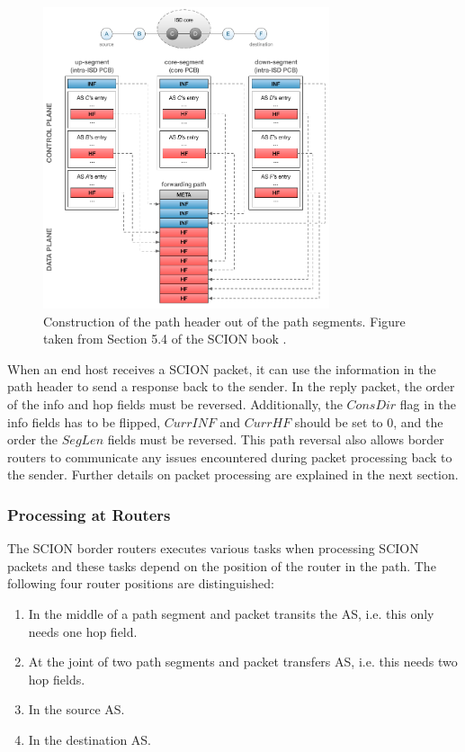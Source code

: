\begin{figure}[h]
    \centering
    \includegraphics[width=0.75\textwidth]{figures/scion_path_header_construction.png}
    \caption{Construction of the path header out of the path segments. Figure taken from Section 5.4 of the SCION book \cite{Perrig2022}.}
    \label{fig:scion_path_header_contruction}
\end{figure}

When an end host receives a SCION packet, it can use the information in the path header to send a response back to the sender.
In the reply packet, the order of the info and hop fields must be reversed.
Additionally, the $ConsDir$ flag in the info fields has to be flipped, $CurrINF$ and $CurrHF$ should be set to 0, and the order the $SegLen$ fields must be reversed.
This path reversal also allows border routers to communicate any issues encountered during packet processing back to the sender.
Further details on packet processing are explained in the next section.

\subsubsection{Processing at Routers}

The SCION border routers executes various tasks when processing SCION packets and these tasks depend on the position of the router in the path.
The following four router positions are distinguished:

\begin{enumerate}[label=P\arabic*]
    \item In the middle of a path segment and packet transits the AS, i.e. this only needs one hop field.
    \item At the joint of two path segments and packet transfers AS, i.e. this needs two hop fields.
    \item In the source AS.
    \item In the destination AS.
\end{enumerate}

